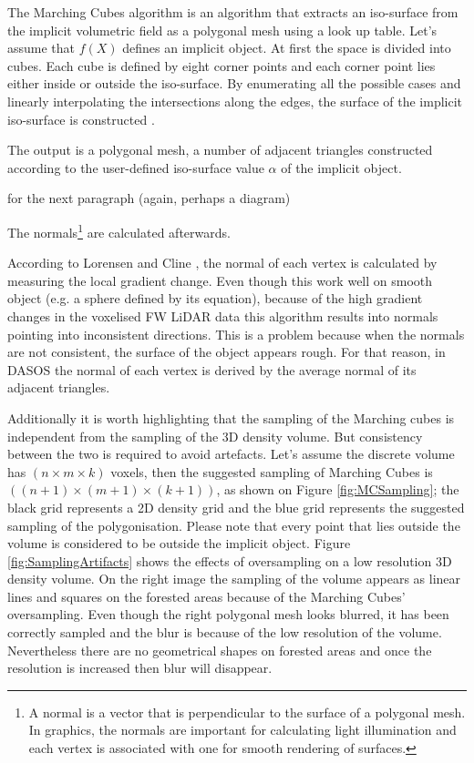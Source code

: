 \documentclass{subfiles}
\begin{document}
\par The Marching Cubes algorithm is an algorithm that extracts an iso-surface from the implicit volumetric field as a polygonal mesh using a look up table. Let’s assume that $f(X)$ defines an implicit object. At first the space is divided into cubes. Each cube is defined by eight corner points and each corner point lies either inside or outside the iso-surface. By enumerating all the possible cases and linearly interpolating the intersections along the edges, the surface of the implicit iso-surface is constructed \cite{Lorensen1987}. {\color{Fuchsia} The output is a polygonal mesh, a number of adjacent triangles constructed according to the user-defined iso-surface value $\alpha$  of the implicit object.
	
	{\color{red} for the next paragraph (again, perhaps a diagram)}
\par  The normals\footnote{ A normal is a vector that is perpendicular to the surface of a polygonal mesh. In graphics, the normals are important for calculating light illumination and each vertex is associated with one for smooth rendering of surfaces.} are calculated afterwards.} According to Lorensen and Cline \cite{Lorensen1987}, the normal of each vertex is calculated by measuring the local gradient change. Even though this work well on smooth object (e.g. a sphere defined by its equation), because of the high gradient changes in the voxelised FW LiDAR data this algorithm results into normals pointing into inconsistent directions. This is a problem because when the normals are not consistent, the surface of the object appears rough. For that reason, in DASOS the normal of each vertex is derived by the average normal of its adjacent triangles. 




\par Additionally it is worth highlighting that the sampling of the Marching cubes is independent from the sampling of the 3D density volume. But consistency between the two is required to avoid artefacts. Let’s assume the discrete volume has $(n \times m \times k)$ voxels, then the suggested sampling of Marching Cubes is $((n+1) \times (m+1) \times (k+1))$, as shown on Figure \ref{fig:MCSampling}; the black grid represents a 2D density grid and the blue grid represents the suggested sampling of the polygonisation. Please note that every point that lies outside the volume is considered to be outside the implicit object. {\color{Fuchsia} Figure \ref{fig:SamplingArtifacts} shows the effects of oversampling on a low resolution 3D density volume. On the right image the sampling of the volume appears as linear lines and squares on the forested areas because of the Marching Cubes' oversampling. Even though the right polygonal mesh looks blurred, it has been correctly sampled and the blur is because of the low resolution of the volume. Nevertheless there are no geometrical shapes on forested areas and once the resolution is increased then blur will disappear. }
\end{document}
